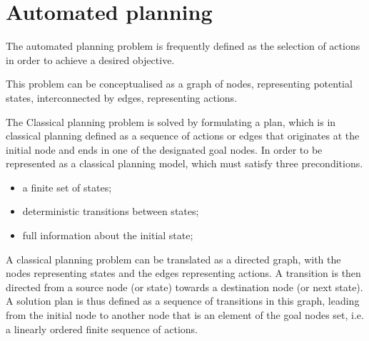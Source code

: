 \section{Automated planning}\label{section:bg:planning}

The automated planning problem is frequently defined as the selection of actions in order to achieve a desired objective.

This problem can be conceptualised as a graph of nodes, representing potential states, interconnected by edges, representing actions.

The Classical planning problem is solved by formulating a plan, which is in classical planning defined as a sequence of actions or edges that originates at the initial node and ends in one of the designated goal nodes.
In order to be represented as a classical planning model, which must satisfy three preconditions.
\begin{itemize}
    \item a finite set of states;
    \item deterministic transitions between states;
    \item full information about the initial state;
\end{itemize}

A classical planning problem can be translated as a directed graph, with the nodes representing states and the edges representing actions.
A transition is then directed from a source node (or state) towards a destination node (or next state).
A solution plan is thus defined as a sequence of transitions in this graph, leading from the initial node to another node that is an element of the goal nodes set, i.e. a linearly ordered finite sequence of actions.

